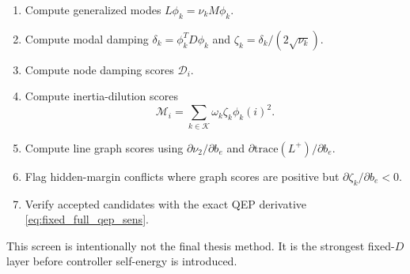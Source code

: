 \begin{enumerate}
\item Compute generalized modes \(L\phi_k=\nu_kM\phi_k\).
\item Compute modal damping \(\delta_k=\phi_k^TD\phi_k\) and
\(\zeta_k=\delta_k/(2\sqrt{\nu_k})\).
\item Compute node damping scores \(\mathcal D_i\).
\item Compute inertia-dilution scores
\begin{equation}
  \mathcal M_i
  =
  \sum_{k\in\mathcal K}
  \omega_k\zeta_k\phi_k(i)^2.
  \label{eq:inertia_dilution_score}
\end{equation}
\item Compute line graph scores using \(\partial\nu_2/\partial b_e\) and
\(\partial\mathrm{trace}(L^+)/\partial b_e\).
\item Flag hidden-margin conflicts where graph scores are positive but
\(\partial\zeta_k/\partial b_e<0\).
\item Verify accepted candidates with the exact QEP derivative
\eqref{eq:fixed_full_qep_sens}.
\end{enumerate}

This screen is intentionally not the final thesis method. It is the strongest
fixed-\(D\) layer before controller self-energy is introduced.
